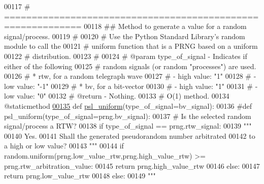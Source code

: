 \begin{DoxyCode}
00117     \textcolor{comment}{# ============================================================}
00118     \textcolor{comment}{##  Method to generate a value for a random signal/process.}
00119     \textcolor{comment}{#}
00120     \textcolor{comment}{#   Use the Python Standard Library's random module to call the}
00121     \textcolor{comment}{#       uniform function that is a PRNG based on a uniform}
00122     \textcolor{comment}{#       distribution.}
00123     \textcolor{comment}{#}
00124     \textcolor{comment}{#   @param type\_of\_signal - Indicates if either of the following}
00125     \textcolor{comment}{#               random signals (or random "processes") are used.}
00126     \textcolor{comment}{#               * rtw, for a random telegraph wave}
00127     \textcolor{comment}{#                   - high value: "1"}
00128     \textcolor{comment}{#                   - low value: "-1"}
00129     \textcolor{comment}{#               * bv, for a bit-vector}
00130     \textcolor{comment}{#                   - high value: "1"}
00131     \textcolor{comment}{#                   - low value: "0"}
00132     \textcolor{comment}{#   @return - Nothing.}
00133     \textcolor{comment}{#   O(1) method.}
00134     @staticmethod
\hypertarget{pseudorandom__number__generator_8py_source_l00135}{}\hyperlink{classrandom__process__models_1_1pseudorandom__number__generator_1_1prng_a1dcc8cc1bddef1852a007afc2f115f5e}{00135}     \textcolor{keyword}{def }\hyperlink{classrandom__process__models_1_1pseudorandom__number__generator_1_1prng_a1dcc8cc1bddef1852a007afc2f115f5e}{psl\_uniform}(type\_of\_signal=bv\_signal):
00136     \textcolor{comment}{#def psl\_uniform(type\_of\_signal=prng.bv\_signal):}
00137         \textcolor{comment}{# Is the selected random signal/process a RTW?}
00138         \textcolor{keywordflow}{if} type\_of\_signal == prng.rtw\_signal:
00139             \textcolor{stringliteral}{"""}
00140 \textcolor{stringliteral}{                Yes.}
00141 \textcolor{stringliteral}{                Shall the generated pseudorandom number arbitrated}
00142 \textcolor{stringliteral}{                    to a high or low value?}
00143 \textcolor{stringliteral}{            """}
00144             \textcolor{keywordflow}{if} random.uniform(prng.low\_value\_rtw,prng.high\_value\_rtw) >= prng.rtw\_arbitration\_value:
00145                 \textcolor{keywordflow}{return} prng.high\_value\_rtw
00146             \textcolor{keywordflow}{else}:
00147                 \textcolor{keywordflow}{return} prng.low\_value\_rtw
00148         \textcolor{keywordflow}{else}:
00149             \textcolor{stringliteral}{"""}

\end{DoxyCode}
